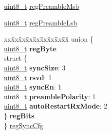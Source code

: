 \begin{DoxyCompactItemize}
\begin{tabbing}
\end{tabbing}\item 
\hyperlink{vl53l0x__types_8h_aba7bc1797add20fe3efdf37ced1182c5}{uint8\+\_\+t} \hyperlink{structFSK__Register__Map_af81f911a0c63594bac0ef3f11085be01}{reg\+Preamble\+Msb}
\item 
\hyperlink{vl53l0x__types_8h_aba7bc1797add20fe3efdf37ced1182c5}{uint8\+\_\+t} \hyperlink{structFSK__Register__Map_a57cfe311a3ec957f1ec09f3637feaf5d}{reg\+Preamble\+Lsb}
\item 
\begin{tabbing}
xx\=xx\=xx\=xx\=xx\=xx\=xx\=xx\=xx\=\kill
union \{\\
\>\hyperlink{vl53l0x__types_8h_aba7bc1797add20fe3efdf37ced1182c5}{uint8\_t} {\bfseries regByte}\\
\>struct \{\\
\>\>\hyperlink{vl53l0x__types_8h_aba7bc1797add20fe3efdf37ced1182c5}{uint8\_t} {\bfseries syncSize}: 3\\
\>\>\hyperlink{vl53l0x__types_8h_aba7bc1797add20fe3efdf37ced1182c5}{uint8\_t} {\bfseries rsvd}: 1\\
\>\>\hyperlink{vl53l0x__types_8h_aba7bc1797add20fe3efdf37ced1182c5}{uint8\_t} {\bfseries syncEn}: 1\\
\>\>\hyperlink{vl53l0x__types_8h_aba7bc1797add20fe3efdf37ced1182c5}{uint8\_t} {\bfseries preamblePolarity}: 1\\
\>\>\hyperlink{vl53l0x__types_8h_aba7bc1797add20fe3efdf37ced1182c5}{uint8\_t} {\bfseries autoRestartRxMode}: 2\\
\>\} {\bfseries regBits}\\
\} \hyperlink{structFSK__Register__Map_a1007328afb50e8cb0d98daf772d3bfba}{regSyncCfg}\\


\end{tabbing}
\end{DoxyCompactItemize}
